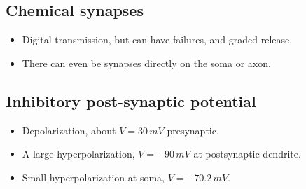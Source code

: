 \documentclass[a4paper, 12pt]{article}
\begin{document}
\subsection{Chemical synapses}
\begin{figure}[H]
	\centering
\end{figure}
\begin{itemize}[noitemsep,nolistsep]
	\item Digital transmission, but can have failures, and graded release.
	\item There can even be synapses directly on the soma or axon.
\end{itemize}

\subsection{Inhibitory post-synaptic potential}
\begin{itemize}[noitemsep,nolistsep]
	\item Depolarization, about $V=30\,mV$ presynaptic.
	\item A large hyperpolarization, $V=-90\,mV$ at postsynaptic dendrite.
	\item Small hyperpolarization at soma, $V=-70.2\,mV$.
\end{itemize}
\end{document}
